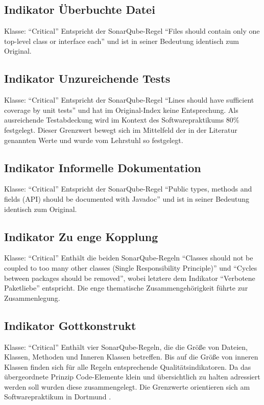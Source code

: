 \documentclass[da,ngerman]{stthesis}
\begin{document}
  			\subsection{Indikator Überbuchte Datei}
  				Klasse: "`Critical"' \newline
  				Entspricht der SonarQube-Regel "`Files should contain only one top-level class or interface each"' und ist in seiner Bedeutung identisch zum Original.
  			\subsection{Indikator Unzureichende Tests}
  				Klasse: "`Critical"' \newline
  				Entspricht der SonarQube-Regel "`Lines should have sufficient coverage by unit tests"' und hat im Original-Index keine Entsprechung. Als ausreichende Testabdeckung wird im Kontext des Softwarepraktikums 80\% festgelegt. Dieser Grenzwert bewegt sich im Mittelfeld der in der Literatur genannten Werte und wurde vom Lehrstuhl so festgelegt.
  			\subsection{Indikator Informelle Dokumentation}
  				Klasse: "`Critical"' \newline
  				Entspricht der SonarQube-Regel "`Public types, methods and fields (API) should be documented with Javadoc"' und ist in seiner Bedeutung identisch zum Original.
  			\subsection{Indikator Zu enge Kopplung}
  				Klasse: "`Critical"' \newline
  				Enthält die beiden SonarQube-Regeln "`Classes should not be coupled to too many other classes (Single Responsibility Principle)"' und "`Cycles between packages should be removed"', wobei letztere dem Indikator "`Verbotene Paketliebe"' entspricht. Die enge thematische Zusammengehörigkeit führte zur Zusammenlegung.
  			\subsection{Indikator Gottkonstrukt}
  				Klasse: "`Critical"' \newline
  				Enthält vier SonarQube-Regeln, die die Größe von Dateien, Klassen, Methoden und Inneren Klassen betreffen. Bis auf die Größe von inneren Klassen finden sich für alle Regeln entsprechende Qualitätsindikatoren. Da das übergeordnete Prinzip Code-Elemente klein und übersichtlich zu halten adressiert werden soll wurden diese zusammengelegt. Die Grenzwerte orientieren sich am Softwarepraktikum in Dortmund \cite{CleanCodeImPraktikum}.
\end{document}
